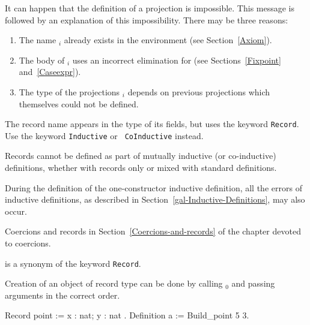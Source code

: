 \begin{Warnings}
\item {}

  It can happen that the definition of a projection is impossible.
  This message is followed by an explanation of this impossibility.
  There may be three reasons:
   \begin{enumerate}
   \item The name {\ident$_i$} already exists in the environment (see
     Section~\ref{Axiom}).
   \item The body of {\ident$_i$} uses an incorrect elimination for
     {\ident} (see Sections~\ref{Fixpoint} and~\ref{Caseexpr}).
   \item The type of the projections {\ident$_i$} depends on previous
   projections which themselves could not be defined.
   \end{enumerate}  
\end{Warnings}     

\begin{ErrMsgs}

\item {}

  The record name {\ident} appears in the type of its fields, but uses
  the keyword  {\tt Record}. Use  the keyword {\tt Inductive}  or {\tt
    CoInductive} instead.
\item {}

  Records  cannot  be  defined  as  part  of  mutually  inductive  (or
  co-inductive) definitions,  whether with records only  or mixed with
  standard definitions.
\item During the definition of the one-constructor inductive
  definition, all the errors of inductive definitions, as described in
  Section~\ref{gal-Inductive-Definitions}, may also occur.

\end{ErrMsgs}

\SeeAlso Coercions and records in Section~\ref{Coercions-and-records}
of the chapter devoted to coercions.

 is a synonym of the keyword {\tt Record}.

\Rem Creation of an object of record type can be done by calling {\ident$_0$}
and passing arguments in the correct order.

\begin{coq_example}
Record point := { x : nat; y : nat }.
Definition a := Build_point 5 3.
\end{coq_example}

